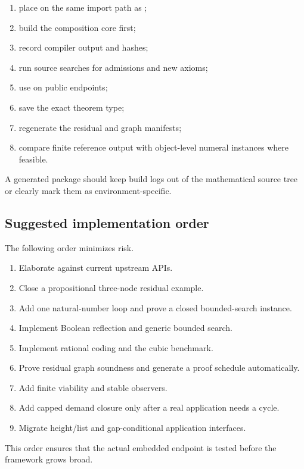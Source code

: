 \begin{enumerate}
\item place  on the same import path as ;
\item build the composition core first;
\item record compiler output and hashes;
\item run source searches for admissions and new axioms;
\item use  on public endpoints;
\item save the exact theorem type;
\item regenerate the residual and graph manifests;
\item compare finite reference output with object-level numeral instances where feasible.
\end{enumerate}

A generated package should keep build logs out of the mathematical source tree or clearly mark them as environment-specific.

\subsection{Suggested implementation order}

The following order minimizes risk.

\begin{enumerate}
\item Elaborate  against current upstream APIs.
\item Close a propositional three-node residual example.
\item Add one natural-number loop and prove a closed bounded-search instance.
\item Implement Boolean reflection and generic bounded search.
\item Implement rational coding and the cubic benchmark.
\item Prove residual graph soundness and generate a proof schedule automatically.
\item Add finite viability and stable observers.
\item Add capped demand closure only after a real application needs a cycle.
\item Migrate height/list and gap-conditional application interfaces.
\end{enumerate}

This order ensures that the actual embedded endpoint is tested before the framework grows broad.

